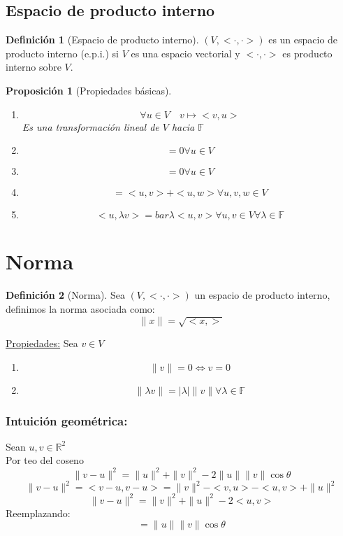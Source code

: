 \documentclass[11pt]{book}
\newcommand{\set}[1]{\mathbb{#1}}
\newtheorem{prop}[thm]{Proposición}
\theoremstyle{definition}
\newtheorem{defn}{Definición}[section]
\begin{document}
\subsection{Espacio de producto interno}
\begin{defn}[Espacio de producto interno]
	$(V,<\cdot,\cdot>)$ es un espacio de producto interno (e.p.i.) si $V$ es una espacio vectorial y $<\cdot,\cdot>$ es producto interno sobre $V$.
\end{defn}
\begin{prop}[Propiedades básicas]
	\
	\begin{enumerate}[label=(\alph*)]
		\item \[\forall u\in V\quad v\mapsto <v,u> \]
		Es una transformación lineal de $V$ hacia $\set{F}$

		\item \[<0,u>=0\forall u\in V\]

		\item \[<u,0>=0\forall u\in V\]

		\item \[<u,v+w>=<u,v>+<u,w>\forall u,v,w\in V\]

		\item \[<u,\lambda v>=bar{\lambda}<u,v>\forall u,v\in V \forall \lambda\in\set{F}\]
	\end{enumerate}
\end{prop}
\section{Norma}
\begin{defn}[Norma]
	Sea $(V,<\cdot,\cdot>)$ un espacio de producto interno, definimos la norma asociada como:
	\[\|x\|=\sqrt{<x,>}\]
\end{defn}
\underline{Propiedades:} Sea $v\in V$
\begin{enumerate}[label=(\alph*)]
	\item \[\|v\|=0\iff v=0\]

	\item \[\|\lambda v\|=|\lambda|\|v\|\forall \lambda\in \set{F}\]
\end{enumerate}
\subsubsection{Intuición geométrica:}
Sean $u,v\in\set{R}^2$\\
Por teo del coseno
\[\|v-u\|^2=\|u\|^2+\|v\|^2-2\|u\|\|v\|\cos\theta\]
\[\|v-u\|^2=<v-u,v-u>=\|v\|^2-<v,u>-<u,v>+\|u\|^2\]
\[\|v-u\|^2=\|v\|^2+\|u\|^2-2<u,v>\]
Reemplazando:
\[<u,v>=\|u\|\|v\|\cos\theta\]
\end{document}
